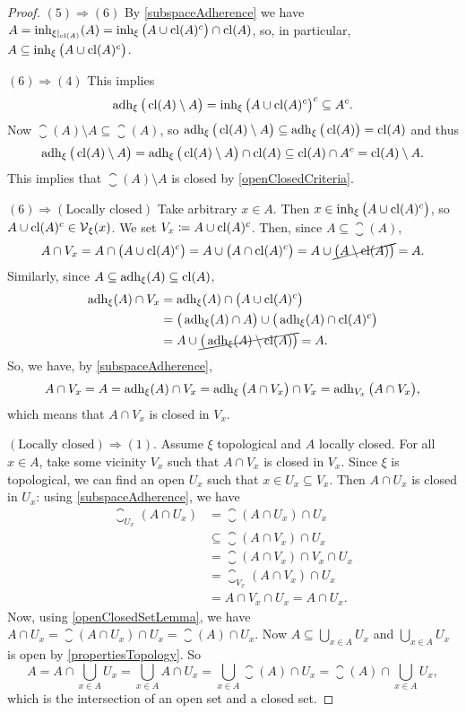 \begin{proof}
$(5) \Rightarrow (6)$ By \ref{subspaceAdherence} we have $A = \operatorname{inh}_{\xi|_{\operatorname{cl}(A)}}(A) = \operatorname{inh}_\xi\big(A \cup \operatorname{cl}(A)^c\big) \cap \operatorname{cl}(A)$, so, in particular, $A \subseteq \operatorname{inh}_\xi\big(A \cup \operatorname{cl}(A)^c\big)$.

$(6) \Rightarrow (4)$ This implies
\[ \operatorname{adh}_\xi\big(\operatorname{cl}(A)\setminus A\big) = \operatorname{inh}_\xi\big(A \cup \operatorname{cl}(A)^c\big)^c \subseteq A^c. \]
Now $\closure(A)\setminus A \subseteq \closure(A)$, so $\operatorname{adh}_\xi\big(\operatorname{cl}(A)\setminus A\big) \subseteq \operatorname{adh}_\xi\big(\operatorname{cl}(A)\big) = \operatorname{cl}(A)$ and thus
\[ \operatorname{adh}_\xi\big(\operatorname{cl}(A)\setminus A\big) = \operatorname{adh}_\xi\big(\operatorname{cl}(A)\setminus A\big) \cap \operatorname{cl}(A) \subseteq \operatorname{cl}(A) \cap A^c = \operatorname{cl}(A)\setminus A. \]
This implies that $\closure(A) \setminus A$ is closed by \ref{openClosedCriteria}.


$(6) \Rightarrow (\text{Locally closed})$ Take arbitrary $x\in A$. Then $x\in \operatorname{inh}_\xi\big(A \cup \operatorname{cl}(A)^c\big)$, so $A\cup \operatorname{cl}(A)^c \in \operatorname{\mathcal{V}}_\xi(x)$. We set $V_x \coloneqq A\cup \operatorname{cl}(A)^c$. Then, since $A\subseteq \closure(A)$,
\[ A\cap V_x = A\cap \big(A \cup \operatorname{cl}(A)^c\big) = A \cup \big(A \cap \operatorname{cl}(A)^c\big) = A \cup \cancel{\big(A \setminus \operatorname{cl}(A)\big)} = A. \]
Similarly, since $A\subseteq \operatorname{adh}_\xi(A)\subseteq \operatorname{cl}(A)$,
\begin{align*}
\operatorname{adh}_\xi(A)\cap V_x &= \operatorname{adh}_\xi(A)\cap \big(A \cup \operatorname{cl}(A)^c\big) \\
&= \big(\operatorname{adh}_\xi(A) \cap A\big) \cup \big(\operatorname{adh}_\xi(A) \cap \operatorname{cl}(A)^c\big) \\
&= A \cup \cancel{\big(\operatorname{adh}_\xi(A) \setminus \operatorname{cl}(A)\big)} = A.
\end{align*}
So, we have, by \ref{subspaceAdherence},
\[ A\cap V_x = A = \operatorname{adh}_\xi(A)\cap V_x = \operatorname{adh}_\xi\big(A\cap V_x\big)\cap V_x = \operatorname{adh}_{V_x}\big(A\cap V_x\big), \]
which means that $A\cap V_x$ is closed in $V_x$.

$(\text{Locally closed}) \Rightarrow (1)$. Assume $\xi$ topological and $A$ locally closed. For all $x\in A$, take some vicinity $V_x$ such that $A\cap V_x$ is closed in $V_x$. Since $\xi$ is topological, we can find an open $U_x$ such that $x\in U_x\subseteq V_x$. Then $A\cap U_x$ is closed in $U_x$: using \ref{subspaceAdherence}, we have
\begin{align*}
\closure_{U_x}(A\cap U_x) &= \closure(A\cap U_x) \cap U_x \\
&\subseteq \closure(A\cap V_x) \cap U_x \\
&= \closure(A\cap V_x) \cap V_x \cap U_x \\
&= \closure_{V_x}(A\cap V_x) \cap U_x \\
&= A\cap V_x \cap U_x = A \cap U_x.
\end{align*}
Now, using \ref{openClosedSetLemma}, we have $A \cap U_x = \closure(A\cap U_x) \cap U_x = \closure(A) \cap U_x$. Now $A\subseteq \bigcup_{x\in A}U_x$ and $\bigcup_{x\in A}U_x$ is open by \ref{propertiesTopology}. So
\[ A = A\cap \bigcup_{x\in A}U_x = \bigcup_{x\in A}A\cap U_x = \bigcup_{x\in A}\closure(A)\cap U_x = \closure(A) \cap \bigcup_{x\in A}U_x, \]
which is the intersection of an open set and a closed set.
\end{proof}

